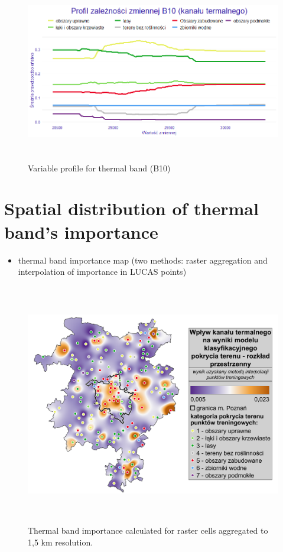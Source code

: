 \documentclass{amuthesis}
\begin{document}
\begin{figure}[t]

{\centering \includegraphics[width=5.90625in,height=3.125in]{./figures/profB10.png}

}

\caption{\label{fig-rycina13}Variable profile for thermal band (B10)}

\end{figure}

\hypertarget{sec-imp-spat}{%
\section{Spatial distribution of thermal band's
importance}\label{sec-imp-spat}}

\begin{itemize}
\tightlist
\item
  thermal band importance map (two methods: raster aggregation and
  interpolation of importance in LUCAS points)
\end{itemize}

\begin{figure}[t]

{\centering \includegraphics[width=5.875in,height=4.16667in]{./figures/B10_importance-spatial.png}

}

\caption{\label{fig-rycina14}Thermal band importance calculated for
raster cells aggregated to 1,5 km resolution.}

\end{figure}
\end{document}
